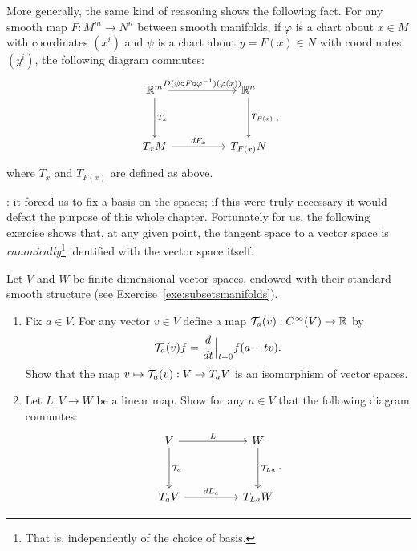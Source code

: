 More generally, the same kind of reasoning shows the following fact. For any smooth map $F:M^m \to N^n$ between smooth manifolds, if $\varphi$ is a chart about $x\in M$ with coordinates $(x^i)$ and $\psi$ is a chart about $y=F(x)\in N$ with coordinates $(y^i)$, the following diagram commutes:
\begin{equation}
  \begin{tikzcd}[row sep=huge, column sep=huge]
    \R^m \arrow[r, "D(\psi \circ F \circ \varphi^{-1})(\varphi(x))"] \arrow[d, "T_x"]
    & \R^n \arrow[d, "T_{F(x)}"] \\
    T_xM \arrow[r, "dF_x"]
    & T_{F(x)}N
  \end{tikzcd},
\end{equation}
where $T_x$ and $T_{F(x)}$ are defined as above.

: it forced us to fix a basis on the spaces; if this were truly necessary it would defeat the purpose of this whole chapter.
Fortunately for us, the following exercise shows that, at any given point, the tangent space to a vector space is \emph{canonically}\footnote{That is, independently of the choice of basis.} identified with the vector space itself.

\begin{exercise}\label{ex:tg_curve_iso}
  Let $V$ and $W$ be finite-dimensional vector spaces, endowed with their standard smooth structure (see Exercise~\ref{exe:subsetsmanifolds}).
  \begin{enumerate}
    \item Fix $a\in V$. For any vector $v\in V$ define a map $\mathcal{T}_a(v) : C^\infty(V) \to \mathbb{R}$ by
          \begin{equation}
            \mathcal{T}_a(v) f = \frac{d}{dt}\Big|_{t=0} f(a + tv).
          \end{equation}
          Show that the map $v\mapsto \mathcal{T}_a(v) : V \to T_aV$ is an isomorphism of vector spaces.
    \item Let $L:V\to W$ be a linear map. Show for any $a\in V$ that the following diagram commutes:
          \begin{equation}
            \begin{tikzcd}[row sep=huge, column sep=huge]
              V \arrow[r, "L"] \arrow[d, "\cT_a"]
              & W \arrow[d, "\cT_{La}"] \\
              T_aV \arrow[r, "dL_a"]
              & T_{La}W
            \end{tikzcd}.
          \end{equation}
  \end{enumerate}
\end{exercise}

